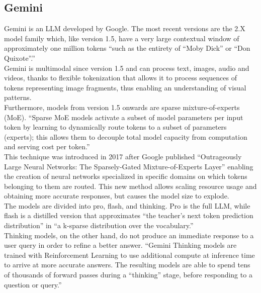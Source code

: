 \documentclass[12pt]{article}
\begin{document}
    \subsection{Gemini}
Gemini is an LLM developed by Google. The most recent versions are the 2.X model family which, like version 1.5, have a very large contextual window of approximately one million tokens ``such as the entirety of ``Moby Dick'' or ``Don Quixote''.''\cite{comanici2025gemini25pushingfrontier}\\
Gemini is multimodal since version 1.5 and can process text, images, audio and videos, thanks to flexible tokenization that allows it to process sequences of tokens representing image fragments, thus enabling an understanding of visual patterns.\\
Furthermore, models from version 1.5 onwards are sparse mixture-of-experts (MoE). ``Sparse MoE models activate a subset of model parameters per input token by learning to dynamically route tokens to a subset of parameters (experts); this allows them to decouple total model capacity from computation and serving cost per token.''\cite{comanici2025gemini25pushingfrontier}\\
This technique was introduced in 2017 after Google published “Outrageously Large Neural Networks: The Sparsely-Gated Mixture-of-Experts Layer”\cite{shazeer2017outrageouslylargeneuralnetworks} enabling the creation of neural networks specialized in specific domains on which tokens belonging to them are routed. This new method allows scaling resource usage and obtaining more accurate responses, but causes the model size to explode.\\
The models are divided into pro, flash, and thinking.
Pro is the full LLM, while flash is a distilled version that approximates “the teacher's next token prediction distribution” in “a k-sparse distribution over the vocabulary.”\\
Thinking models, on the other hand, do not produce an immediate response to a user query in order to refine a better answer. ``Gemini Thinking models are trained with Reinforcement Learning to use additional compute at inference time to arrive at more accurate answers. The resulting models are able to spend tens of thousands of forward passes during a “thinking” stage, before responding to a question or query.''\cite{comanici2025gemini25pushingfrontier}\\
\end{document}
